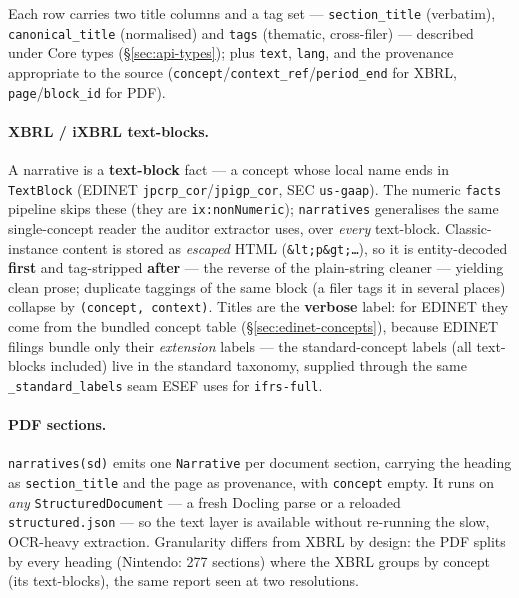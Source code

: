 \documentclass[11pt,a4paper]{report}
\begin{document}
\noindent Each row carries two title columns and a tag set --- \texttt{section\_title} (verbatim),
\texttt{canonical\_title} (normalised) and \texttt{tags} (thematic, cross-filer) --- described under Core
types (\S\ref{sec:api-types}); plus \texttt{text}, \texttt{lang}, and the provenance appropriate to the
source (\texttt{concept}/\texttt{context\_ref}/\texttt{period\_end} for XBRL, \texttt{page}/\texttt{block\_id}
for PDF).

\paragraph{XBRL / iXBRL text-blocks.} A narrative is a \textbf{text-block} fact --- a concept whose local
name ends in \texttt{TextBlock} (EDINET \texttt{jpcrp\_cor}/\texttt{jpigp\_cor}, SEC \texttt{us-gaap}). The
numeric \texttt{facts} pipeline skips these (they are \texttt{ix:nonNumeric}); \texttt{narratives} generalises
the same single-concept reader the auditor extractor uses, over \emph{every} text-block. Classic-instance
content is stored as \emph{escaped} HTML (\texttt{\&lt;p\&gt;\ldots}), so it is entity-decoded \textbf{first}
and tag-stripped \textbf{after} --- the reverse of the plain-string cleaner --- yielding clean prose;
duplicate taggings of the same block (a filer tags it in several places) collapse by
\texttt{(concept, context)}. Titles are the \textbf{verbose} label: for EDINET they come from the bundled
concept table (\S\ref{sec:edinet-concepts}), because EDINET filings bundle only their \emph{extension}
labels --- the standard-concept labels (all text-blocks included) live in the standard taxonomy, supplied
through the same \texttt{\_standard\_labels} seam ESEF uses for \texttt{ifrs-full}.

\paragraph{PDF sections.} \texttt{narratives(sd)} emits one \texttt{Narrative} per document section, carrying
the heading as \texttt{section\_title} and the page as provenance, with \texttt{concept} empty. It runs on
\emph{any} \texttt{StructuredDocument} --- a fresh Docling parse or a reloaded \texttt{structured.json} --- so
the text layer is available without re-running the slow, OCR-heavy extraction. Granularity differs from XBRL
by design: the PDF splits by every heading (Nintendo: 277 sections) where the XBRL groups by concept (its
text-blocks), the same report seen at two resolutions.
\end{document}
